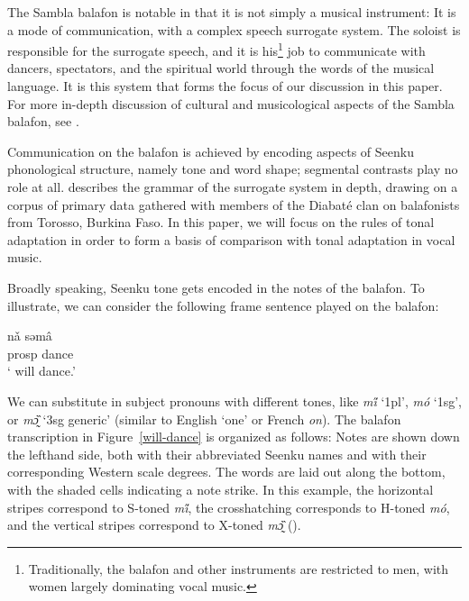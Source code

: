 \documentclass[output=paper]{langscibook}
\begin{document}
The Sambla balafon is notable in that it is not simply a musical instrument: It is a mode of communication, with a complex speech surrogate system. The soloist is responsible for the surrogate speech, and it is his\footnote{Traditionally, the balafon and other instruments are restricted to men, with women largely dominating vocal music.} job to communicate with dancers, spectators, and the spiritual world through the words of the musical language. It is this system that forms the focus of our discussion in this paper. For more in-depth discussion of cultural and musicological aspects of the Sambla balafon, see \citet{Strand2009}.

Communication on the balafon is achieved by encoding aspects of Seenku phonological structure, namely tone and word shape; segmental contrasts play no role at all. \citet{McPherson2019a} describes the grammar of the surrogate system in depth, drawing on a corpus of primary data gathered with members of the Diabaté clan on balafonists from Torosso, Burkina Faso. In this paper, we will focus on  the rules of tonal adaptation in order to form a basis of comparison with tonal adaptation in vocal music.

Broadly speaking, Seenku tone gets encoded in the notes of the balafon. To illustrate, we can consider the following frame sentence played on the balafon:

\ea 
\gll \underline{\hspace{1cm}} nǎ səmâ \\
\underline{\hspace{1cm}} {\sc prosp} dance \\
\glt `\underline{\hspace{1cm}} will dance.' 
\z 

We can substitute in subject pronouns with different tones, like \textit{mi̋} `1pl', \textit{mó} `1sg', or \textit{mɔ̰̏} `3sg generic' (similar to English `one' or French \textit{on}). The balafon transcription in Figure~\ref{will-dance} is organized as follows: Notes are shown down the lefthand side, both with their abbreviated Seenku names and with their corresponding Western scale degrees. The words are laid out along the bottom, with the shaded cells indicating a note strike. In this example, the horizontal stripes correspond to S-toned \textit{mi̋}, the crosshatching corresponds to H-toned \textit{mó}, and the vertical stripes correspond to X-toned \textit{mɔ̰̏} ().
\end{document}
